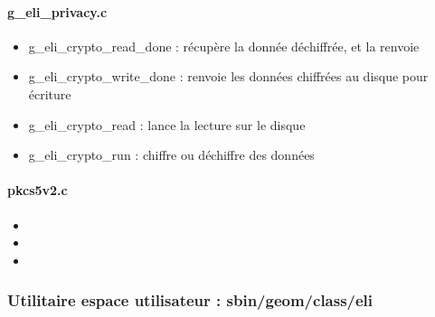 \paragraph{g\_eli\_privacy.c}
\begin{itemize}
	\item g\_eli\_crypto\_read\_done : récupère la donnée déchiffrée, et la
		renvoie
	\item g\_eli\_crypto\_write\_done : renvoie les données chiffrées 
		au disque pour écriture
	\item g\_eli\_crypto\_read : lance la lecture sur le disque
	\item g\_eli\_crypto\_run : chiffre ou déchiffre des données
\end{itemize}

\paragraph{pkcs5v2.c}
\begin{itemize}
	\item
	\item
	\item
\end{itemize}
\subsubsection{Utilitaire espace utilisateur : sbin/geom/class/eli}

